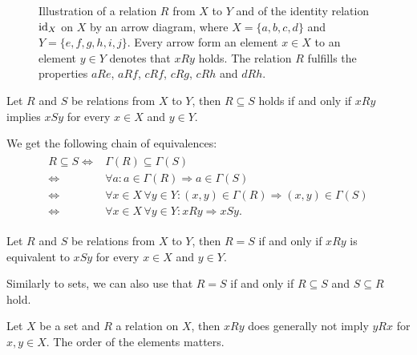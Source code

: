 \begin{figure}[ht]
    \caption{Illustration of a relation $R$ from $X$ to $Y$ and of the identity relation $\text{id}_X$ on $X$ by an arrow diagram, where $X=\{a,b,c,d\}$ and $Y=\{e,f,g,h,i,j\}$. Every arrow form an element $x\in X$ to an element $y\in Y$ denotes that $xRy$ holds. The relation $R$ fulfills the properties $aRe$, $aRf$, $cRf$, $cRg$, $cRh$ and $dRh$.}
\end{figure}

\begin{remarks}
    \begin{remarkenumerate}
        \item Let $R$ and $S$ be relations from $X$ to $Y$, then $R\subseteq S$ holds if and only if $x R y$ implies $x S y$ for every $x\in X$ and $y\in Y$.
        \begin{miniproof}
            We get the following chain of equivalences:
            \begin{align}\begin{split}
                R\subseteq S\iff& \Gamma(R)\subseteq\Gamma(S)\\
                \iff& \forall a\colon a\in\Gamma(R)\Rightarrow a\in\Gamma(S)\\
                \iff& \forall x\in X\,\forall y\in Y\colon (x,y)\in\Gamma(R)\Rightarrow (x,y)\in\Gamma(S)\\
                \iff& \forall x\in X\,\forall y\in Y\colon x R y\Rightarrow x S y.
            \end{split}\end{align}
        \end{miniproof}
        \item Let $R$ and $S$ be relations from $X$ to $Y$, then $R=S$ if and only if $x R y$ is equivalent to $x S y$ for every $x\in X$ and $y\in Y$.
        \item\label{remark:relations:equivalence_subsets} Similarly to sets, we can also use that $R=S$ if and only if $R\subseteq S$ and $S\subseteq R$ hold.
        \item Let $X$ be a set and $R$ a relation on $X$, then $x R y$ does generally not imply $y R x$ for $x,y\in X$. The order of the elements matters.
    \end{remarkenumerate}
\end{remarks}


